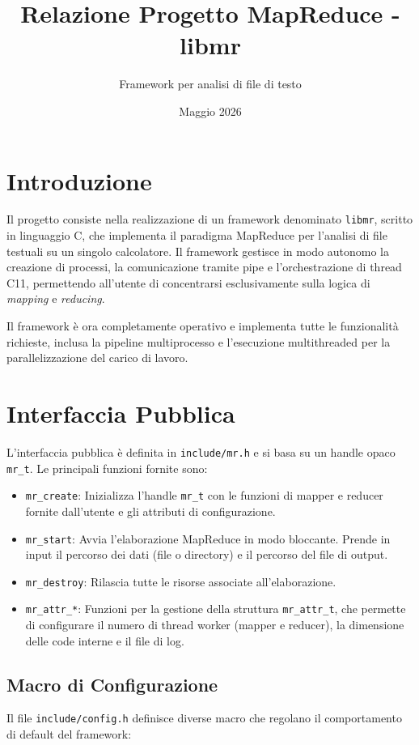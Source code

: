\documentclass[12pt,a4paper]{article}
\title{Relazione Progetto MapReduce - libmr}
\author{Framework per analisi di file di testo}
\date{Maggio 2026}
\begin{document}
\maketitle

\tableofcontents
\newpage

\section{Introduzione}
Il progetto consiste nella realizzazione di un framework denominato \texttt{libmr}, scritto in linguaggio C, che implementa il paradigma MapReduce per l'analisi di file testuali su un singolo calcolatore. Il framework gestisce in modo autonomo la creazione di processi, la comunicazione tramite pipe e l'orchestrazione di thread C11, permettendo all'utente di concentrarsi esclusivamente sulla logica di \textit{mapping} e \textit{reducing}.

Il framework è ora completamente operativo e implementa tutte le funzionalità richieste, inclusa la pipeline multiprocesso e l'esecuzione multithreaded per la parallelizzazione del carico di lavoro.

\section{Interfaccia Pubblica}
L'interfaccia pubblica è definita in \texttt{include/mr.h} e si basa su un handle opaco \texttt{mr\_t}. Le principali funzioni fornite sono:

\begin{itemize}
    \item \texttt{mr\_create}: Inizializza l'handle \texttt{mr\_t} con le funzioni di mapper e reducer fornite dall'utente e gli attributi di configurazione.
    \item \texttt{mr\_start}: Avvia l'elaborazione MapReduce in modo bloccante. Prende in input il percorso dei dati (file o directory) e il percorso del file di output.
    \item \texttt{mr\_destroy}: Rilascia tutte le risorse associate all'elaborazione.
    \item \texttt{mr\_attr\_*}: Funzioni per la gestione della struttura \texttt{mr\_attr\_t}, che permette di configurare il numero di thread worker (mapper e reducer), la dimensione delle code interne e il file di log.
\end{itemize}

\subsection{Macro di Configurazione}
Il file \texttt{include/config.h} definisce diverse macro che regolano il comportamento di default del framework:
\end{document}

